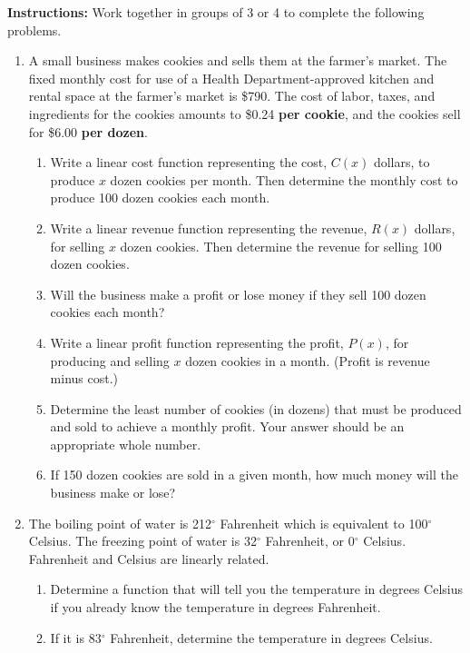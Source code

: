 



\noindent \textbf{Instructions:}  Work together in groups of  3 or 4 to complete the following problems.




\begin{enumerate}

\item A small business makes cookies and sells them at the farmer's
  market.  The fixed monthly cost for use of a Health
  Department-approved kitchen and rental space at the farmer's market
  is \$790.  The cost of labor, taxes, and ingredients for the cookies
  amounts to \$0.24 \textbf{per cookie}, and the cookies sell for
  \$6.00 \textbf{per dozen}.
\begin{enumerate}
\item Write a linear cost function representing the cost, $C(x)$
  dollars, to produce $x$ dozen cookies per month.  Then determine the
  monthly cost to produce 100 dozen cookies each month.
  \vfill
\item Write a linear revenue function representing the revenue, $R(x)$
  dollars, for selling $x$ dozen cookies.  Then determine the revenue
  for selling 100 dozen cookies.
  \vfill
\item Will the business make a profit or lose money if they sell 100 dozen cookies each month?
\vfill
\item Write a linear profit function representing the profit, $P(x)$,
  for producing and selling $x$ dozen cookies in a month. (Profit is
  revenue minus cost.)
  \vfill
\item Determine the least number of cookies (in dozens) that must be
  produced and sold to achieve a monthly profit.  Your answer should
  be an appropriate whole number.
  \vfill
\item If 150 dozen cookies are sold in a given month, how much money will the business make or lose?
\vfill
\end{enumerate}

\clearpage

\item The boiling point of water is 212$^\circ$ Fahrenheit which is
  equivalent to 100$^\circ$ Celsius. The freezing point of water is
  32$^\circ$ Fahrenheit, or 0$^\circ$ Celsius. Fahrenheit and Celsius
  are linearly related.
 
 \begin{enumerate}
 \item Determine a function that will tell you the temperature in degrees Celsius if
you already know the temperature in degrees Fahrenheit.
\vfill
\vfill
 \item If it is 83$^\circ$ Fahrenheit, determine the temperature in degrees Celsius.
 \end{enumerate}
 \vfill
 

\end{enumerate}
